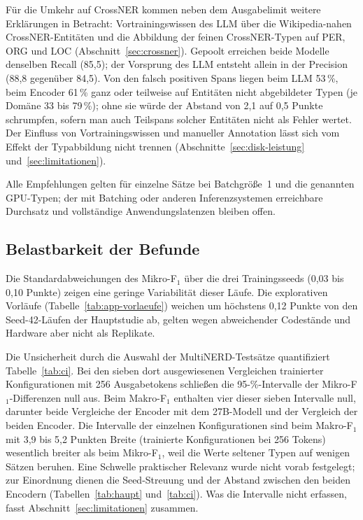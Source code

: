 Für die Umkehr auf CrossNER kommen neben dem Ausgabelimit weitere
Erklärungen in Betracht: Vortrainingswissen des LLM über die
Wikipedia-nahen CrossNER-Entitäten und die Abbildung der feinen
CrossNER-Typen auf PER, ORG und LOC (Abschnitt~\ref{sec:crossner}).
Gepoolt erreichen beide Modelle denselben Recall (85,5); der Vorsprung
des LLM entsteht allein in der Precision (88,8 gegenüber 84,5).
Von den falsch positiven Spans liegen beim LLM 53\,\%, beim Encoder
61\,\% ganz oder teilweise auf Entitäten nicht abgebildeter Typen (je
Domäne 33 bis 79\,\%); ohne sie würde der Abstand von 2,1 auf 0,5
Punkte schrumpfen, sofern man auch Teilspans solcher Entitäten nicht als Fehler
wertet.
Der Einfluss von Vortrainingswissen und manueller Annotation lässt sich
vom Effekt der Typabbildung nicht trennen (Abschnitte~\ref{sec:disk-leistung}
und~\ref{sec:limitationen}).


Alle Empfehlungen gelten für einzelne Sätze bei Batchgröße~1 und die
genannten GPU-Typen; der mit Batching oder anderen Inferenzsystemen
erreichbare Durchsatz und vollständige Anwendungslatenzen bleiben offen.

\subsection{Belastbarkeit der Befunde}
\label{sec:disk-validitaet}

Die Standardabweichungen des Mikro-F$_1$ über die drei Trainingsseeds
(0,03 bis 0,10 Punkte) zeigen eine geringe Variabilität dieser Läufe.
Die explorativen Vorläufe (Tabelle~\ref{tab:app-vorlaeufe}) weichen um
höchstens 0,12 Punkte von den Seed-42-Läufen der Hauptstudie ab, gelten
wegen abweichender Codestände und Hardware aber nicht als Replikate.

Die Unsicherheit durch die Auswahl der MultiNERD-Testsätze
quantifiziert Tabelle~\ref{tab:ci}. Bei den sieben dort ausgewiesenen Vergleichen
trainierter Konfigurationen mit 256 Ausgabetokens schließen die
95-\%-Intervalle der Mikro-F$_1$-Differenzen null aus. Beim Makro-F$_1$
enthalten vier dieser sieben Intervalle null, darunter beide Vergleiche
der Encoder mit dem 27B-Modell und der Vergleich der beiden Encoder.
Die Intervalle der einzelnen
Konfigurationen sind beim Makro-F$_1$ mit 3,9 bis 5,2 Punkten Breite
(trainierte Konfigurationen bei 256 Tokens) wesentlich breiter als beim
Mikro-F$_1$, weil die Werte seltener Typen auf wenigen Sätzen
beruhen.
Eine Schwelle praktischer Relevanz wurde nicht vorab festgelegt; zur
Einordnung dienen die Seed-Streuung und der Abstand zwischen den beiden
Encodern
(Tabellen~\ref{tab:haupt} und~\ref{tab:ci}).
Was die Intervalle nicht erfassen, fasst
Abschnitt~\ref{sec:limitationen} zusammen.

